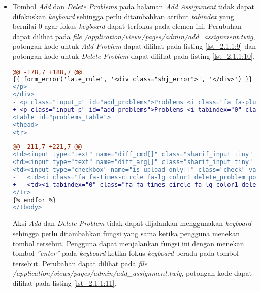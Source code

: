 \begin{itemize}
	\item Tombol \textit{Add} dan \textit{Delete Problems} pada halaman \textit{Add Assignment} tidak dapat difokuskan \textit{keyboard} sehingga perlu ditambahkan atribut \textit{tabindex} yang bernilai 0 agar fokus \textit{keyboard} dapat terfokus pada elemen ini. Perubahan dapat dilihat pada \textit{file} \textit{/application/views/pages/admin/add\_assignment.twig}, potongan kode untuk \textit{Add Problem} dapat dilihat pada listing \ref{lst_2.1.1:9} dan potongan kode untuk \textit{Delete Problem} dapat dilihat pada listing \ref{lst_2.1.1:10}.
	
\begin{lstlisting}[language=diff, caption=Perubahan untuk \textit{Add Problem} pada \textit{file} \textit{add\_assignment.twig}, label=lst_2.1.1:9, basicstyle=\ttfamily, frame=single,
columns=fullflexible, keepspaces=true, breaklines=true]
@@ -178,7 +188,7 @@
{{ form_error('late_rule', '<div class="shj_error">', '</div>') }}
</p>
</div>
- <p class="input_p" id="add_problems">Problems <i class="fa fa-plus-circle fa-lg color11 pointer" id="add"></i>
+ <p class="input_p" id="add_problems">Problems <i tabindex="0" class="fa fa-plus-circle fa-lg color11 pointer" id="add"></i>
<table id="problems_table">
<thead>
<tr>
\end{lstlisting}

\begin{lstlisting}[language=diff, caption=Perubahan untuk \textit{Delete Problem} pada \textit{file} \textit{add\_assignment.twig}, label=lst_2.1.1:10, basicstyle=\ttfamily, frame=single,
columns=fullflexible, keepspaces=true, breaklines=true]
@@ -211,7 +221,7 @@
<td><input type="text" name="diff_cmd[]" class="sharif_input tiny" value="{{ problem.diff_cmd }}"/></td>
<td><input type="text" name="diff_arg[]" class="sharif_input tiny" value="{{ problem.diff_arg }}"/></td>
<td><input type="checkbox" name="is_upload_only[]" class="check" value="{{ problem.id }}" {{ problem.is_upload_only ? 'checked' }}/></td>
- 	<td><i class="fa fa-times-circle fa-lg color1 delete_problem pointer"></i></td>
+ 	<td><i tabindex="0" class="fa fa-times-circle fa-lg color1 delete_problem pointer"></i></td>
</tr>
{% endfor %}
</tbody>
\end{lstlisting}

	Aksi \textit{Add} dan \textit{Delete Problem} tidak dapat dijalankan menggunakan \textit{keyboard} sehingga perlu ditambahkan fungsi yang sama ketika pengguna menekan tombol tersebut. Pengguna dapat menjalankan fungsi ini dengan menekan tombol \textit{''enter''} pada \textit{keyboard} ketika fokus \textit{keyboard} berada pada tombol tersebut. Perubahan dapat dilihat pada \textit{file} \textit{/application/views/pages/admin/add\_assignment.twig}, potongan kode dapat dilihat pada listing \ref{lst_2.1.1:11}.
	

\end{itemize}
